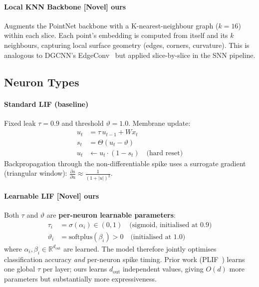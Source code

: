 \documentclass[11pt,a4paper]{article}
\newcommand{\novel}[1]{\textcolor{novelgreen}{\textbf{[Novel]} #1}}
\begin{document}
\paragraph{Local KNN Backbone \novel{ours}}
Augments the PointNet backbone with a K-nearest-neighbour graph ($k=16$) within
each slice. Each point's embedding is computed from itself and its $k$ neighbours,
capturing local surface geometry (edges, corners, curvature). This is analogous
to DGCNN's EdgeConv~\cite{dgcnn} but applied slice-by-slice in the SNN pipeline.

\subsection{Neuron Types}

\paragraph{Standard LIF (baseline)}
Fixed leak $\tau = 0.9$ and threshold $\vartheta = 1.0$. Membrane update:
\begin{align}
  u_t &= \tau \, u_{t-1} + W x_t \label{eq:lif_mem}\\
  s_t &= \Theta(u_t - \vartheta) \label{eq:lif_spike}\\
  u_t &\leftarrow u_t \cdot (1 - s_t) \quad \text{(hard reset)} \label{eq:lif_reset}
\end{align}
Backpropagation through the non-differentiable spike uses a surrogate gradient
(triangular window): $\frac{\partial s}{\partial u} \approx \frac{1}{(1 + |u|)^2}$.

\paragraph{Learnable LIF \novel{ours}}
Both $\tau$ and $\vartheta$ are \textbf{per-neuron learnable parameters}:
\begin{align}
  \tau_i &= \sigma(\alpha_i) \in (0,1) \quad \text{(sigmoid, initialised at 0.9)}\\
  \vartheta_i &= \text{softplus}(\beta_i) > 0 \quad \text{(initialised at 1.0)}
\end{align}
where $\alpha_i, \beta_i \in \mathbb{R}^{d_\text{out}}$ are learned. The model
therefore jointly optimises classification accuracy \emph{and} per-neuron spike
timing. Prior work (PLIF~\cite{fang2021plif}) learns one global $\tau$ per layer;
ours learns $d_\text{out}$ independent values, giving $O(d)$ more parameters but
substantially more expressiveness.
\end{document}
